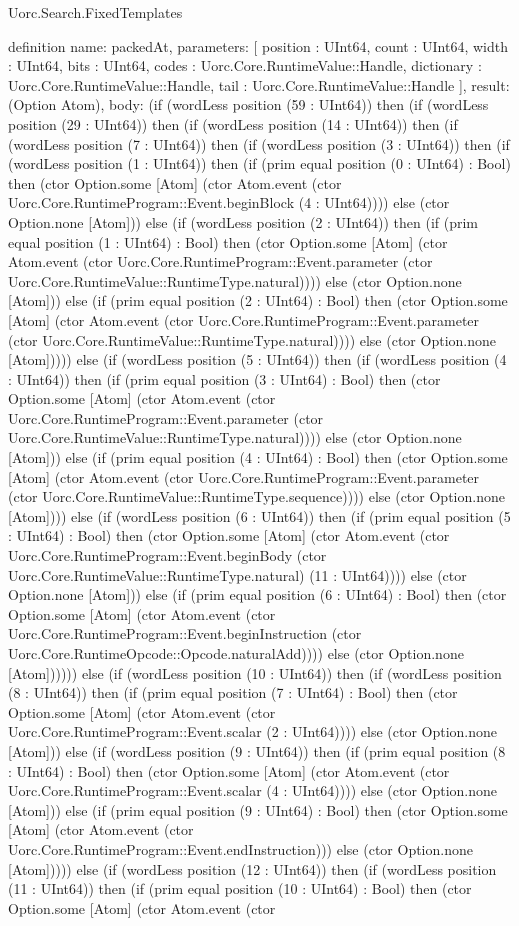 \begin{lexlean}{Uorc.Search.FixedTemplates}
\begin{semanticmodule}
definition{
  name: packedAt,
  parameters: [
    position : UInt64,
    count : UInt64,
    width : UInt64,
    bits : UInt64,
    codes : Uorc.Core.RuntimeValue::Handle,
    dictionary : Uorc.Core.RuntimeValue::Handle,
    tail : Uorc.Core.RuntimeValue::Handle
  ],
  result: (Option Atom),
  body: (if (wordLess position (59 : UInt64)) then (if (wordLess position (29 : UInt64)) then (if (wordLess position (14 : UInt64)) then (if (wordLess position (7 : UInt64)) then (if (wordLess position (3 : UInt64)) then (if (wordLess position (1 : UInt64)) then (if (prim equal position (0 : UInt64) : Bool) then (ctor Option.some [Atom] (ctor Atom.event (ctor Uorc.Core.RuntimeProgram::Event.beginBlock (4 : UInt64)))) else (ctor Option.none [Atom])) else (if (wordLess position (2 : UInt64)) then (if (prim equal position (1 : UInt64) : Bool) then (ctor Option.some [Atom] (ctor Atom.event (ctor Uorc.Core.RuntimeProgram::Event.parameter (ctor Uorc.Core.RuntimeValue::RuntimeType.natural)))) else (ctor Option.none [Atom])) else (if (prim equal position (2 : UInt64) : Bool) then (ctor Option.some [Atom] (ctor Atom.event (ctor Uorc.Core.RuntimeProgram::Event.parameter (ctor Uorc.Core.RuntimeValue::RuntimeType.natural)))) else (ctor Option.none [Atom])))) else (if (wordLess position (5 : UInt64)) then (if (wordLess position (4 : UInt64)) then (if (prim equal position (3 : UInt64) : Bool) then (ctor Option.some [Atom] (ctor Atom.event (ctor Uorc.Core.RuntimeProgram::Event.parameter (ctor Uorc.Core.RuntimeValue::RuntimeType.natural)))) else (ctor Option.none [Atom])) else (if (prim equal position (4 : UInt64) : Bool) then (ctor Option.some [Atom] (ctor Atom.event (ctor Uorc.Core.RuntimeProgram::Event.parameter (ctor Uorc.Core.RuntimeValue::RuntimeType.sequence)))) else (ctor Option.none [Atom]))) else (if (wordLess position (6 : UInt64)) then (if (prim equal position (5 : UInt64) : Bool) then (ctor Option.some [Atom] (ctor Atom.event (ctor Uorc.Core.RuntimeProgram::Event.beginBody (ctor Uorc.Core.RuntimeValue::RuntimeType.natural) (11 : UInt64)))) else (ctor Option.none [Atom])) else (if (prim equal position (6 : UInt64) : Bool) then (ctor Option.some [Atom] (ctor Atom.event (ctor Uorc.Core.RuntimeProgram::Event.beginInstruction (ctor Uorc.Core.RuntimeOpcode::Opcode.naturalAdd)))) else (ctor Option.none [Atom]))))) else (if (wordLess position (10 : UInt64)) then (if (wordLess position (8 : UInt64)) then (if (prim equal position (7 : UInt64) : Bool) then (ctor Option.some [Atom] (ctor Atom.event (ctor Uorc.Core.RuntimeProgram::Event.scalar (2 : UInt64)))) else (ctor Option.none [Atom])) else (if (wordLess position (9 : UInt64)) then (if (prim equal position (8 : UInt64) : Bool) then (ctor Option.some [Atom] (ctor Atom.event (ctor Uorc.Core.RuntimeProgram::Event.scalar (4 : UInt64)))) else (ctor Option.none [Atom])) else (if (prim equal position (9 : UInt64) : Bool) then (ctor Option.some [Atom] (ctor Atom.event (ctor Uorc.Core.RuntimeProgram::Event.endInstruction))) else (ctor Option.none [Atom])))) else (if (wordLess position (12 : UInt64)) then (if (wordLess position (11 : UInt64)) then (if (prim equal position (10 : UInt64) : Bool) then (ctor Option.some [Atom] (ctor Atom.event (ctor }
\end{semanticmodule}
\end{lexlean}
